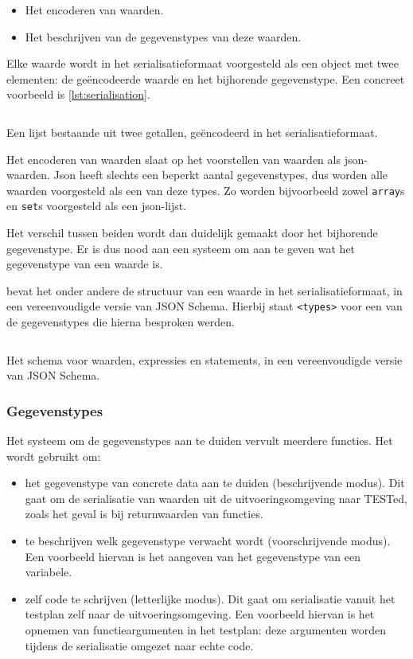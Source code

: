 \begin{itemize}
    \item Het encoderen van waarden.
    \item Het beschrijven van de gegevenstypes van deze waarden.
\end{itemize}

Elke waarde wordt in het serialisatieformaat voorgesteld als een object met twee elementen: de geëncodeerde waarde en het bijhorende gegevenstype.
Een concreet voorbeeld is \cref{lst:serialisation}.

\begin{listing}
    \inputminted{json}{code/format.json}
    \caption{Een lijst bestaande uit twee getallen, geëncodeerd in het serialisatieformaat.}
    \label{lst:serialisation}
\end{listing}

Het encoderen van waarden slaat op het voorstellen van waarden als json-waarden.
Json heeft slechts een beperkt aantal gegevenstypes, dus worden alle waarden voorgesteld als een van deze types.
Zo worden bijvoorbeeld zowel \texttt{array}s en \texttt{set}s voorgesteld als een json-lijst.

Het verschil tussen beiden wordt dan duidelijk gemaakt door het bijhorende gegevenstype.
Er is dus nood aan een systeem om aan te geven wat het gegevenstype van een waarde is.

 bevat het onder andere de structuur van een waarde in het serialisatieformaat, in een vereenvoudigde versie van JSON Schema.
Hierbij staat \texttt{<types>} voor een van de gegevenstypes die hierna besproken werden.

\begin{listing}
    \inputminted{json}{code/type-schema.json}
    \caption{Het schema voor waarden, expressies en statements, in een vereenvoudigde versie van JSON Schema.}
    \label{lst:type-schema}
\end{listing}

\subsubsection{Gegevenstypes}

Het systeem om de gegevenstypes aan te duiden vervult meerdere functies.
Het wordt gebruikt om:

\begin{itemize}
    \item het gegevenstype van concrete data aan te duiden (beschrijvende modus).
    Dit gaat om de serialisatie van waarden uit de uitvoeringsomgeving naar TESTed, zoals het geval is bij returnwaarden van functies.
    \item te beschrijven welk gegevenstype verwacht wordt (voorschrijvende modus).
    Een voorbeeld hiervan is het aangeven van het gegevenstype van een variabele.
    \item zelf code te schrijven (letterlijke modus).
    Dit gaat om serialisatie vanuit het testplan zelf naar de uitvoeringsomgeving.
    Een voorbeeld hiervan is het opnemen van functieargumenten in het testplan: deze argumenten worden tijdens de serialisatie omgezet naar echte code.
\end{itemize}

